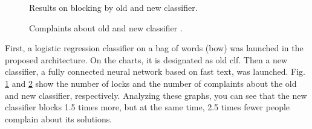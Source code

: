 \documentclass[12pt]{jpconf}
\begin{document}
\begin{figure}[h!]
	\centering
	\caption{\label{fig:04} Results on blocking by old and new classifier.}
\end{figure}


\begin{figure}[t!]
	\centering
	\caption{\label{fig:05} Complaints about old and new classifier .}
\end{figure}

First, a logistic regression classifier on a bag of words (bow) was launched in the proposed architecture. On the charts, it is designated as old clf. Then a new classifier, a fully connected neural network based on fast text, was launched. Fig. \ref{fig:04} and \ref{fig:05} show the number of locks and the number of complaints about the old and new classifier, respectively. Analyzing these graphs, you can see that the new classifier blocks 1.5 times more, but at the same time, 2.5 times fewer people complain about its solutions.
\end{document}
